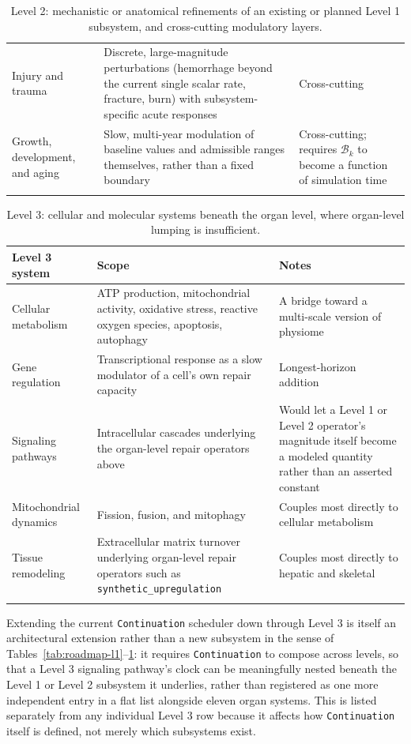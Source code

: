 \documentclass[11pt]{article}
\begin{document}
\begin{longtable}{@{}p{2.6cm}p{7.3cm}p{2.8cm}@{}}
Injury and trauma & Discrete, large-magnitude perturbations (hemorrhage beyond the current single scalar rate, fracture, burn) with subsystem-specific acute responses & Cross-cutting \\
Growth, development, and aging & Slow, multi-year modulation of baseline values and admissible ranges themselves, rather than a fixed boundary & Cross-cutting; requires $\mathcal B_k$ to become a function of simulation time \\
\bottomrule
\caption{Level 2: mechanistic or anatomical refinements of an existing or planned Level 1 subsystem, and cross-cutting modulatory layers.}
\label{tab:roadmap-l2}
\end{longtable}

\begin{longtable}{@{}p{2.6cm}p{7.3cm}p{2.8cm}@{}}
\toprule
Level 3 system & Scope & Notes \\
\midrule
\endhead
Cellular metabolism & ATP production, mitochondrial activity, oxidative stress, reactive oxygen species, apoptosis, autophagy & A bridge toward a multi-scale version of physiome \\
Gene regulation & Transcriptional response as a slow modulator of a cell's own repair capacity & Longest-horizon addition \\
Signaling pathways & Intracellular cascades underlying the organ-level repair operators above & Would let a Level 1 or Level 2 operator's magnitude itself become a modeled quantity rather than an asserted constant \\
Mitochondrial dynamics & Fission, fusion, and mitophagy & Couples most directly to cellular metabolism \\
Tissue remodeling & Extracellular matrix turnover underlying organ-level repair operators such as \texttt{synthetic\_upregulation} & Couples most directly to hepatic and skeletal \\
\bottomrule
\caption{Level 3: cellular and molecular systems beneath the organ level, where organ-level lumping is insufficient.}
\label{tab:roadmap-l3}
\end{longtable}

Extending the current \texttt{Continuation} scheduler down through Level 3 is itself an architectural extension rather than a new subsystem in the sense of Tables~\ref{tab:roadmap-l1}--\ref{tab:roadmap-l2}: it requires \texttt{Continuation} to compose across levels, so that a Level 3 signaling pathway's clock can be meaningfully nested beneath the Level 1 or Level 2 subsystem it underlies, rather than registered as one more independent entry in a flat list alongside eleven organ systems. This is listed separately from any individual Level 3 row because it affects how \texttt{Continuation} itself is defined, not merely which subsystems exist.
\end{document}
